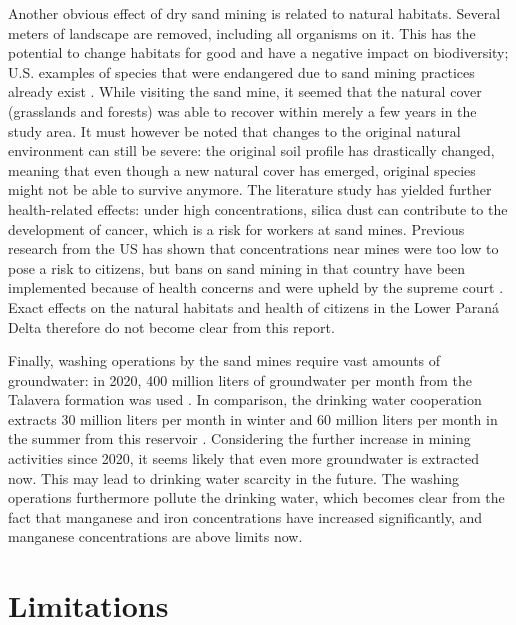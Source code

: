 Another obvious effect of dry sand mining is related to natural habitats. Several meters of landscape are removed, including all organisms on it. This has the potential to change habitats for good and have a negative impact on biodiversity; U.S. examples of species that were endangered due to sand mining practices already exist \autocite{centerforbiologicaldiversityLegalInterventionLaunched2025}. While visiting the sand mine, it seemed that the natural cover (grasslands and forests) was able to recover within merely a few years in the study area. It must however be noted that changes to the original natural environment can still be severe: the original soil profile has drastically changed, meaning that even though a new natural cover has emerged, original species might not be able to survive anymore. The literature study has yielded further health-related effects: under high concentrations, silica dust can contribute to the development of cancer, which is a risk for workers at sand mines. Previous research from the US has shown that concentrations near mines were too low to pose a risk to citizens, but bans on sand mining in that country have been implemented because of health concerns and were upheld by the supreme court \autocite{petersCommunityAirborneParticulate2017} \autocite{physiciansforsocialresponsibilityCompendiumScientificMedical2023}. Exact effects on the natural habitats and health of citizens in the Lower Paraná Delta therefore do not become clear from this report. 

Finally, washing operations by the sand mines require vast amounts of groundwater: in 2020, 400 million liters of groundwater per month from the Talavera formation was used \autocite{cauceArenasParaFracking2022}. In comparison, the drinking water cooperation extracts 30 million liters per month in winter and 60 million liters per month in the summer from this reservoir \autocite{fogliaSedArena2023}. Considering the further increase in mining activities since 2020, it seems likely that even more groundwater is extracted now. This may lead to drinking water scarcity in the future. The washing operations furthermore pollute the drinking water, which becomes clear from the fact that manganese and iron concentrations have increased significantly, and manganese concentrations are above limits now.



\section{Limitations}

